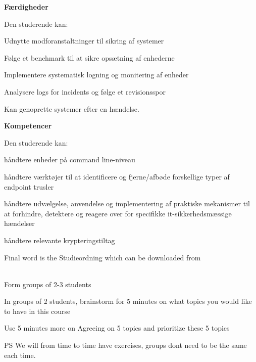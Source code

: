 \documentclass[Screen16to9,17pt]{foils}
\begin{document}
{\bf Færdigheder}

Den studerende kan:
\begin{list2}
\item Udnytte modforanstaltninger til sikring af systemer
\item Følge et benchmark til at sikre opsætning af enhederne
\item Implementere systematisk logning og monitering af enheder
\item Analysere logs for incidents og følge et revisionsspor
\item Kan genoprette systemer efter en hændelse.
\end{list2}


{\bf Kompetencer}

Den studerende kan:
\begin{list2}
\item håndtere enheder på command line-niveau
\item håndtere værktøjer til at identificere og fjerne/afbøde forskellige typer af endpoint trusler
\item håndtere udvælgelse, anvendelse og implementering af praktiske mekanismer til at forhindre, detektere og reagere over for specifikke it-sikkerhedsmæssige hændelser
\item håndtere relevante krypteringstiltag
\end{list2}

Final word is the Studieordning which can be downloaded from\\
{\footnotesize {}\\
}



Form groups of 2-3 students

In groups of 2 students, brainstorm for 5 minutes on what topics you would like to have in this course

Use 5 minutes more on Agreeing on 5 topics and prioritize these 5 topics

\vskip 1cm
PS We will from time to time have exercises, groups dont need to be the same each time.


\end{document}
